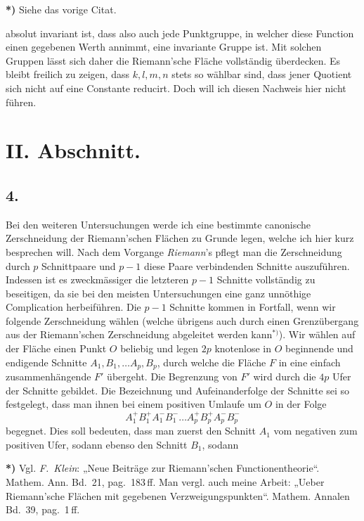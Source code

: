 \documentclass{article}
\begin{document}
\textbf{*)} Siehe das vorige Citat.

absolut invariant ist, dass also auch jede Punktgruppe, in welcher diese Function einen gegebenen Werth annimmt, eine invariante Gruppe ist. Mit solchen Gruppen lässt sich daher die Riemann'sche Fläche vollständig überdecken. Es bleibt freilich zu zeigen, dass $k, l, m, n$ stets so wählbar sind, dass jener Quotient sich nicht auf eine Constante reducirt. Doch will ich diesen Nachweis hier nicht führen.

\section*{II. Abschnitt.}

\subsection*{4.}

Bei den weiteren Untersuchungen werde ich eine bestimmte canonische Zerschneidung der Riemann'schen Flächen zu Grunde legen, welche ich hier kurz besprechen will. Nach dem Vorgange \emph{Riemann}'s pflegt man die Zerschneidung durch $p$ Schnittpaare und $p-1$ diese Paare verbindenden Schnitte auszuführen. Indessen ist es zweckmässiger die letzteren $p-1$ Schnitte vollständig zu beseitigen, da sie bei den meisten Untersuchungen eine ganz unnöthige Complication herbeiführen. Die $p-1$ Schnitte kommen in Fortfall, wenn wir folgende Zerschneidung wählen (welche übrigens auch durch einen Grenzübergang aus der Riemann'schen Zerschneidung abgeleitet werden kann${}^{*)}$). Wir wählen auf der Fläche einen Punkt $O$ beliebig und legen $2p$ knotenlose in $O$ beginnende und endigende Schnitte $A_1, B_1, \dots A_p, B_p$, durch welche die Fläche $F$ in eine einfach zusammenhängende $F'$ übergeht. Die Begrenzung von $F'$ wird durch die $4p$ Ufer der Schnitte gebildet. Die Bezeichnung und Aufeinanderfolge der Schnitte sei so festgelegt, dass man ihnen bei einem positiven Umlaufe um $O$ in der Folge
\[
A_1^+ B_1^+ A_1^- B_1^- \dots A_p^+ B_p^+ A_p^- B_p^-
\]
begegnet. Dies soll bedeuten, dass man zuerst den Schnitt $A_1$ vom negativen zum positiven Ufer, sodann ebenso den Schnitt $B_1$, sodann


\textbf{*)} Vgl. \emph{F.~Klein}: „Neue Beiträge zur Riemann'schen Functionentheorie“. Mathem. Ann. Bd.~21, pag.~183\,ff. Man vergl. auch meine Arbeit: „Ueber Riemann'sche Flächen mit gegebenen Verzweigungspunkten“. Mathem. Annalen Bd.~39, pag.~1\,ff.
\end{document}
